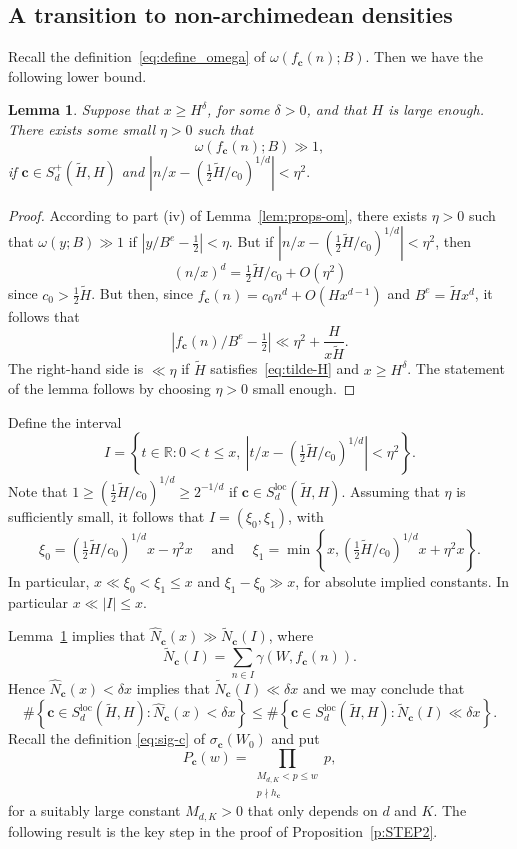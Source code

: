 \documentclass[11pt,letterpaper]{amsart}
\renewcommand{\leq}{\leqslant}
\renewcommand{\geq}{\geqslant}
\newtheorem{lemma}[theorem]{Lemma}
\theoremstyle{definition}
\numberwithin{equation}{section}
\newcommand\RR{\mathbb{R}}
\renewcommand{\c}{\mathbf{c}}
\newcommand{\0}{\mathbf{0}}
\begin{document}
\subsection{A transition to non-archimedean densities}
  
   
   Recall the definition~\eqref{eq:define_omega} of $\omega(f_\c(n);B)$.  Then we have the   following lower bound. 

\begin{lemma}\label{lem:apple}
Suppose that $x\geq H^\delta$, for some $\delta>0$, and that $H$ is large enough. There exists some small $\eta>0$ 
such that 
$$
\omega(f_\c(n);B)\gg 1, 
$$ 
if $\c\in 
   S_d^{+}(\tilde H, H)$ and 
$
|n/x-(\tfrac{1}{2}\tilde H/c_0)^{1/d}|< \eta^2.
$
\end{lemma}

\begin{proof}
According to part (iv) of Lemma~\ref{lem:props-om}, there exists $\eta>0$ 
such that 
$\omega(y;B)\gg 1$ if $|y/B^e-\frac{1}{2}|<\eta$. But if  $|n/x-(\tfrac{1}{2}\tilde H/c_0)^{1/d}|< \eta^2$, then 
$$
(n/x)^d=\tfrac{1}{2}\tilde H/c_0 +O(\eta^2)
$$
since $c_0>\frac{1}{2}\tilde H$. But then, since $f_\c(n)=c_0n^d+O(Hx^{d-1})$ and $B^e=\tilde H x^d$, it follows that
$$
|f_\c(n)/B^e-\tfrac{1}{2}|\ll \eta^2 +\frac{H}{x\tilde H}.
$$
The right-hand side  is $\ll \eta$ if $\tilde H$ satisfies~\eqref{eq:tilde-H} and $x\geq H^\delta$.
The statement of the lemma follows by choosing $\eta>0$ small enough. 
\end{proof}

Define the interval
$$
I=\left\{t\in \RR: 0<t\leq x, ~|t/x-(\tfrac{1}{2}\tilde H/c_0)^{1/d}|< \eta^2\right\}.
$$
Note that 
$1\geq (\tfrac{1}{2}\tilde H/c_0)^{1/d}\geq 2^{-1/d}$
if $\c\in S_d^{\text{loc}}(\tilde H, H)$. 	
Assuming that $\eta$ is sufficiently small, it follows that 
$I=(\xi_0,\xi_1)$, with 
$$
\xi_0=(\tfrac{1}{2}\tilde H/c_0)^{1/d}x-\eta^2 x \quad\text{ and } \quad
\xi_1= \min\left\{x, (\tfrac{1}{2}\tilde H/c_0)^{1/d}x+\eta^2 x\right\}.
$$
In particular, 
$x\ll \xi_0<\xi_1\leq x$ and
$\xi_1-\xi_0\gg x$, for absolute implied constants. In particular $x\ll |I|\leq x$.

Lemma~\ref{lem:apple} implies that 
$\hat N_\c(x)\gg \tilde N_\c(I)$, 
where
$$
\tilde N_\c(I)= \sum_{n\in I} \gamma(W,f_\c(n)).
$$
Hence $\hat N_\c(x) <\delta x$ implies that $\tilde N_\c(I) \ll \delta x$ and we may conclude that 
\begin{equation}\label{eq:dog}
\#\left\{ \c\in S_d^{\text{loc}}(\tilde H, H): 
\hat N_\c(x) <\delta x\right\} \leq
\#\left\{ \c\in S_d^{\text{loc}}(\tilde H, H): 
\tilde N_\c(I) \ll \delta x\right\}.
\end{equation}
Recall 
the definition 
\eqref{eq:sig-c} of 
$\sigma_\c(W_0)$ and put 
$$
P_\c(w)=\prod_{\substack{M_{d,K}<p\leq w\\ p\nmid h_\c}} p,
$$
for a suitably large constant  $M_{d,K}>0$ that only depends on $d$ and $K$. 
The following result is the key step in the proof of Proposition~\ref{p:STEP2}.
\end{document}
